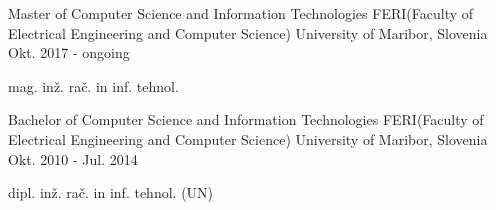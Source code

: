 

\begin{cventries}

  \cventry
    {Master of Computer Science and Information Technologies} %
    {FERI(Faculty of Electrical Engineering and Computer Science)} %
    {University of Maribor, Slovenia} %
    {Okt. 2017 - ongoing} %
    {
      \begin{cvitems} %
        \item {mag. inž. rač. in inf. tehnol.}
      \end{cvitems}
    }


\cventry
{Bachelor of Computer Science and Information Technologies} %
{FERI(Faculty of Electrical Engineering and Computer Science)} %
{University of Maribor, Slovenia} %
{Okt. 2010 - Jul. 2014} %
{
  \begin{cvitems} %
    \item {dipl. inž. rač. in inf. tehnol. (UN)}
  \end{cvitems}
}


\end{cventries}
